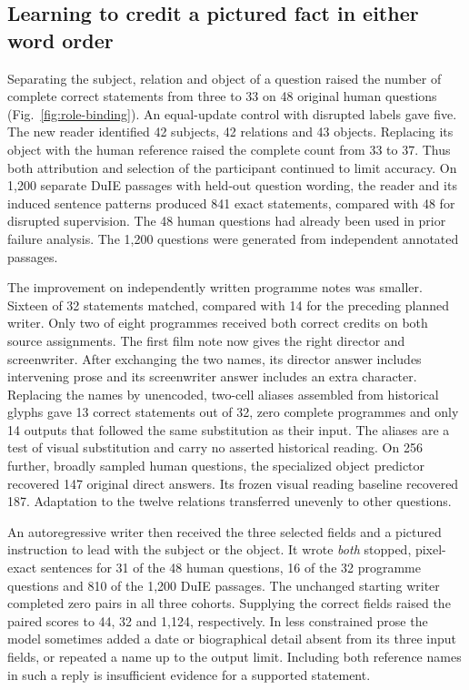 \subsection*{Learning to credit a pictured fact in either word order}
Separating the subject, relation and object of a question raised the number of complete correct statements from three to 33 on 48 original human questions (Fig.~\ref{fig:role-binding}). An equal-update control with disrupted labels gave five. The new reader identified 42 subjects, 42 relations and 43 objects. Replacing its object with the human reference raised the complete count from 33 to 37. Thus both attribution and selection of the participant continued to limit accuracy. On 1,200 separate DuIE passages with held-out question wording, the reader and its induced sentence patterns produced 841 exact statements, compared with 48 for disrupted supervision. The 48 human questions had already been used in prior failure analysis. The 1,200 questions were generated from independent annotated passages.

The improvement on independently written programme notes was smaller. Sixteen of 32 statements matched, compared with 14 for the preceding planned writer. Only two of eight programmes received both correct credits on both source assignments. The first film note now gives the right director and screenwriter. After exchanging the two names, its director answer includes intervening prose and its screenwriter answer includes an extra character. Replacing the names by unencoded, two-cell aliases assembled from historical glyphs gave 13 correct statements out of 32, zero complete programmes and only 14 outputs that followed the same substitution as their input. The aliases are a test of visual substitution and carry no asserted historical reading. On 256 further, broadly sampled human questions, the specialized object predictor recovered 147 original direct answers. Its frozen visual reading baseline recovered 187. Adaptation to the twelve relations transferred unevenly to other questions.

An autoregressive writer then received the three selected fields and a pictured instruction to lead with the subject or the object. It wrote \emph{both} stopped, pixel-exact sentences for 31 of the 48 human questions, 16 of the 32 programme questions and 810 of the 1,200 DuIE passages. The unchanged starting writer completed zero pairs in all three cohorts. Supplying the correct fields raised the paired scores to 44, 32 and 1,124, respectively. In less constrained prose the model sometimes added a date or biographical detail absent from its three input fields, or repeated a name up to the output limit. Including both reference names in such a reply is insufficient evidence for a supported statement.
